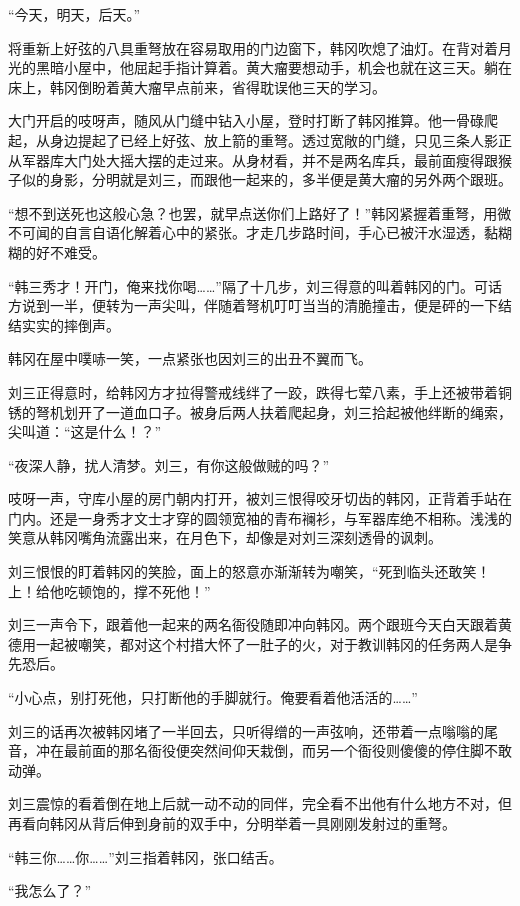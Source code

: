 “今天，明天，后天。”

将重新上好弦的八具重弩放在容易取用的门边窗下，韩冈吹熄了油灯。在背对着月光的黑暗小屋中，他屈起手指计算着。黄大瘤要想动手，机会也就在这三天。躺在床上，韩冈倒盼着黄大瘤早点前来，省得耽误他三天的学习。

大门开启的吱呀声，随风从门缝中钻入小屋，登时打断了韩冈推算。他一骨碌爬起，从身边提起了已经上好弦、放上箭的重弩。透过宽敞的门缝，只见三条人影正从军器库大门处大摇大摆的走过来。从身材看，并不是两名库兵，最前面瘦得跟猴子似的身影，分明就是刘三，而跟他一起来的，多半便是黄大瘤的另外两个跟班。

“想不到送死也这般心急？也罢，就早点送你们上路好了！”韩冈紧握着重弩，用微不可闻的自言自语化解着心中的紧张。才走几步路时间，手心已被汗水湿透，黏糊糊的好不难受。

“韩三秀才！开门，俺来找你喝……”隔了十几步，刘三得意的叫着韩冈的门。可话方说到一半，便转为一声尖叫，伴随着弩机叮叮当当的清脆撞击，便是砰的一下结结实实的摔倒声。

韩冈在屋中噗哧一笑，一点紧张也因刘三的出丑不翼而飞。

刘三正得意时，给韩冈方才拉得警戒线绊了一跤，跌得七荤八素，手上还被带着铜锈的弩机划开了一道血口子。被身后两人扶着爬起身，刘三拾起被他绊断的绳索，尖叫道：“这是什么！？”

“夜深人静，扰人清梦。刘三，有你这般做贼的吗？”

吱呀一声，守库小屋的房门朝内打开，被刘三恨得咬牙切齿的韩冈，正背着手站在门内。还是一身秀才文士才穿的圆领宽袖的青布襕衫，与军器库绝不相称。浅浅的笑意从韩冈嘴角流露出来，在月色下，却像是对刘三深刻透骨的讽刺。

刘三恨恨的盯着韩冈的笑脸，面上的怒意亦渐渐转为嘲笑，“死到临头还敢笑！上！给他吃顿饱的，撑不死他！”

刘三一声令下，跟着他一起来的两名衙役随即冲向韩冈。两个跟班今天白天跟着黄德用一起被嘲笑，都对这个村措大怀了一肚子的火，对于教训韩冈的任务两人是争先恐后。

“小心点，别打死他，只打断他的手脚就行。俺要看着他活活的……”

刘三的话再次被韩冈堵了一半回去，只听得缯的一声弦响，还带着一点嗡嗡的尾音，冲在最前面的那名衙役便突然间仰天栽倒，而另一个衙役则傻傻的停住脚不敢动弹。

刘三震惊的看着倒在地上后就一动不动的同伴，完全看不出他有什么地方不对，但再看向韩冈从背后伸到身前的双手中，分明举着一具刚刚发射过的重弩。

“韩三你……你……”刘三指着韩冈，张口结舌。

“我怎么了？”

